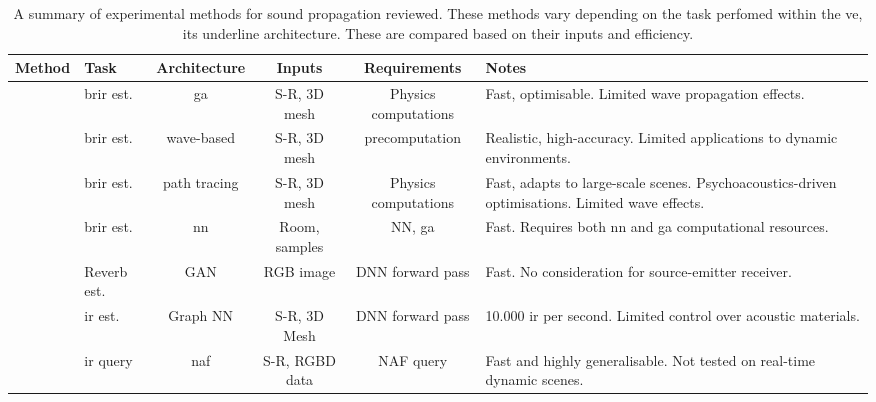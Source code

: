 \begin{landscape}
    \begin{table}[tbp]
        \centering
        \caption{A summary of experimental methods for sound propagation reviewed. These methods vary depending on the task perfomed within the \acrshort{ve}, its underline architecture. These are compared based on their inputs and efficiency.}
            
            \begin{tabularx}{\linewidth}{llcccX}
                \toprule
                Method                                            & Task                     & Architecture   & Inputs                        & Requirements        & Notes \\ \midrule
                \cite{schroder2011physically} & \acrshort{brir} est.     & \acrshort{ga}  & S-R, 3D mesh   & Physics computations              & Fast, optimisable. Limited wave propagation effects. \\
                \cite{mehra2015wave}                              & \acrshort{brir} est.     & wave-based     & S-R, 3D mesh                  & precomputation      & Realistic, high-accuracy. Limited applications to dynamic environments. \\
                \cite{schissler2016interactive}                   & \acrshort{brir} est.     & path tracing   & S-R, 3D mesh                  & Physics computations & Fast, adapts to large-scale scenes. Psychoacoustics-driven optimisations. Limited wave effects. \\
                \cite{tang2020scene}                              & \acrshort{brir} est.     & \acrshort{nn}  & Room, samples\footnotemark[1] & NN, \acrshort{ga}   & Fast. Requires both \acrshort{nn} and \acrshort{ga} computational resources.\\
                \cite{Singh_2021_ICCV}                            & Reverb est.              & GAN            & RGB image                     & DNN forward pass    & Fast. No consideration for source-emitter receiver. \\
                \cite{ratnarajah2022mesh2ir}                      & \acrshort{ir} est.       & Graph NN       & S-R, 3D Mesh                  & DNN forward pass    & 10.000 \acrshort{ir} per second\footnotemark[2]. Limited control over acoustic materials.\\
                \cite{liang2023neural}                            & \acrshort{ir} query      & \acrshort{naf} & S-R, RGBD data                & NAF query           & Fast and highly generalisable. Not tested on real-time dynamic scenes.\\ 

\end{tabularx}
\end{table}
\end{landscape}
